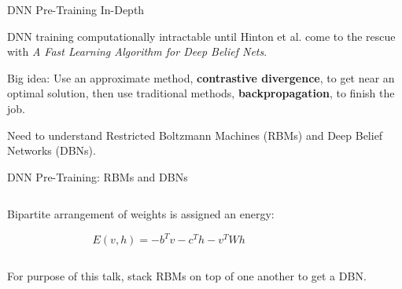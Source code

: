 \documentclass[notes]{beamer}
\begin{document}
\begin{frame}{DNN Pre-Training In-Depth}
	\vfill

	\begin{center}
		DNN training computationally intractable until Hinton et al. come to the rescue with \textit{A Fast Learning Algorithm for Deep Belief Nets}.
	\end{center}
	
	\vfill

	\begin{center}
		Big idea: Use an approximate method, \textbf{contrastive divergence}, to get near an optimal solution, then use traditional methods, \textbf{backpropagation}, to finish the job. 
	\end{center}
	
	\vfill
	
	\begin{center}
		Need to understand Restricted Boltzmann Machines (RBMs) and Deep Belief Networks (DBNs).
	\end{center}
	
	\vfill
\end{frame}

\begin{frame}{DNN Pre-Training: RBMs and DBNs}
	\vfill

	\begin{columns}
		\begin{column}{0.4\linewidth}
			\begin{center}
				Bipartite arrangement of weights is assigned an energy:
			\end{center}
		
			\begin{equation*}	
				E(v, h) = - b^T v - c^T h - v^T W h
			\end{equation*}
		\end{column}
		\begin{column}{0.6\linewidth}
		\end{column}
	\end{columns}
	
	\vfill

	\begin{center}
		For purpose of this talk, stack RBMs on top of one another to get a DBN.
	\end{center}

	\vfill
\end{frame}
\end{document}
